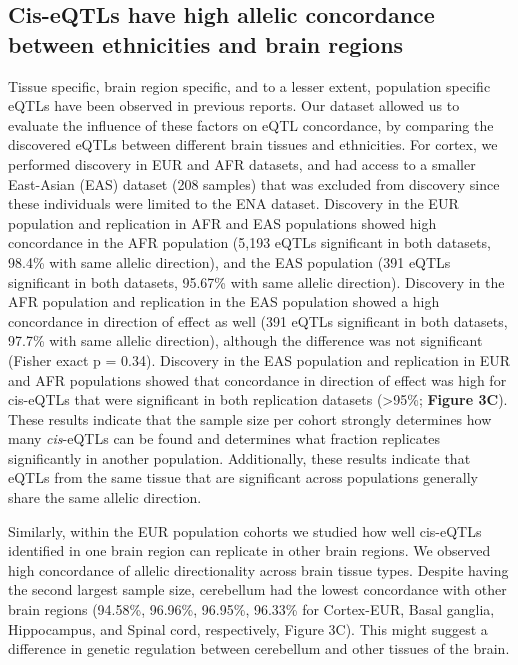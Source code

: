 \subsection{Cis-eQTLs have high allelic concordance between ethnicities and brain regions }
Tissue specific\cite{aguetGeneticEffectsGene2017}, brain region specific\cite{siebertsLargeEQTLMetaanalysis2020}, and to a lesser extent, population specific\cite{shangGeneticArchitectureGene2020} eQTLs have been observed in previous reports. Our dataset allowed us to evaluate the influence of these factors on eQTL concordance, by comparing the discovered eQTLs between different brain tissues and ethnicities. For cortex, we performed discovery in EUR and AFR datasets, and had access to a smaller East-Asian (EAS) dataset (208 samples) that was excluded from discovery since these individuals were limited to the ENA dataset. Discovery in the EUR population and replication in AFR and EAS populations showed high concordance in the AFR population (5,193 eQTLs significant in both datasets, 98.4\% with same allelic direction), and the EAS population (391 eQTLs significant in both datasets, 95.67\% with same allelic direction). Discovery in the AFR population and replication in the EAS population showed a high concordance in direction of effect as well (391 eQTLs significant in both datasets, 97.7\% with same allelic direction), although the difference was not significant (Fisher exact p = 0.34). Discovery in the EAS population and replication in EUR and AFR populations showed that concordance in direction of effect was high for cis-eQTLs that were significant in both replication datasets (>95\%; \textbf{Figure 3C}). These results indicate that the sample size per cohort strongly determines how many \emph{cis}-eQTLs can be found and determines what fraction replicates significantly in another population. Additionally, these results indicate that eQTLs from the same tissue that are significant across populations generally share the same allelic direction. 

Similarly, within the EUR population cohorts we studied how well cis-eQTLs identified in one brain region can replicate in other brain regions. We observed high concordance of allelic directionality across brain tissue types. Despite having the second largest sample size, cerebellum had the lowest concordance with other brain regions (94.58\%, 96.96\%, 96.95\%, 96.33\% for Cortex-EUR, Basal ganglia, Hippocampus, and Spinal cord, respectively, Figure 3C). This might suggest a difference in genetic regulation between cerebellum and other tissues of the brain.  

